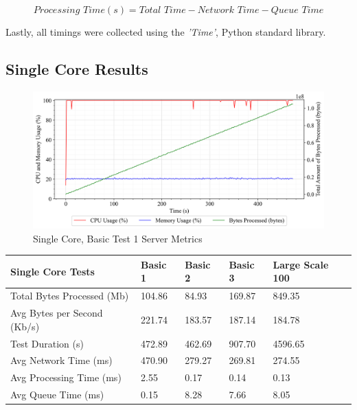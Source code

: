 $$\textit{Processing Time}(s)=\textit{Total Time} - \textit{Network Time} - \textit{Queue Time}$$

Lastly, all timings were collected using the \textit{'Time'}, Python standard library. 

\newpage
\subsection{Single Core Results}
\begin{figure}[ht]
    \begin{center}
    \caption{Single Core, Basic Test 1 Server Metrics}
    \label{Fig:1}
    \includegraphics[width=1.0\textwidth]{Chapter4/Results/1c_results/arty-a7-1c_basic_1_20241004_110917.db_server_metrics.png}
    \end{center}
\end{figure}

\begin{table}[!ht]
    \centering
    \begin{tabular}{|l|l|l|l|l|}
    \hline
        Single Core Tests & Basic 1 & Basic 2 & Basic 3 & Large Scale 100 \\ \hline
        Total Bytes Processed (Mb) & 104.86 & 84.93 & 169.87 & 849.35 \\ \hline
        Avg Bytes per Second (Kb/s) & 221.74 & 183.57 & 187.14 & 184.78 \\ \hline
        Test Duration (s) & 472.89 & 462.69 & 907.70 & 4596.65 \\ \hline
        Avg Network Time (ms) & 470.90 & 279.27 & 269.81 & 274.55 \\ \hline
        Avg Processing Time (ms) & 2.55 & 0.17 & 0.14 & 0.13 \\ \hline
        Avg Queue Time (ms) & 0.15 & 8.28 & 7.66 & 8.05 \\ \hline
    \end{tabular}
\end{table}

